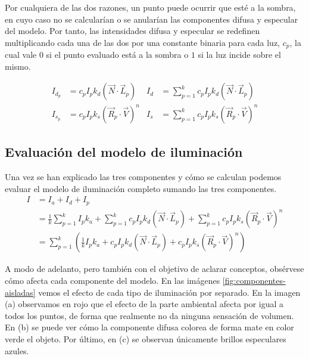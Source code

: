 Por cualquiera de las dos razones, un punto puede ocurrir que esté a la sombra, en cuyo caso no se calcularían o se anularían las componentes difusa y especular del modelo. Por tanto, las intensidades difusa y especular se redefinen multiplicando cada una de las dos por una constante binaria para cada luz, $c_p$, la cual vale $0$ si el punto evaluado está a la sombra o $1$ si la luz incide sobre el mismo.

\begin{align*}
    I_{d_p} &= c_p I_p k_d (\vec N\cdot \vec L_p)  & I_d &= \sum_{p=1}^k c_p I_p k_d (\vec N\cdot \vec L_p)\\
    I_{s_p} &= c_p I_p k_s (\vec R_p\cdot \vec V)^n & I_s &= \sum_{p=1}^k c_p I_p k_s (\vec R_p \cdot \vec V)^n
\end{align*}

\subsection{Evaluación del modelo de iluminación}

Una vez se han explicado las tres componentes y cómo se calculan podemos evaluar el modelo de iluminación completo sumando las tres componentes.
\begin{equation}
    \label{eq:phong}
    \begin{split}
        I &= I_a + I_d + I_p \\
        &=\frac{1}{k}\sum_{p=1}^k I_p k_a + \sum_{p=1}^{k}c_p I_p k_d (\vec N\cdot \vec L_p) + \sum_{p=1}^{k} c_p  I_p k_s (\vec R_p\cdot \vec V)^n \\
        &=\sum_{p=1}^{k}\left(\frac{1}{k}I_p k_a + c_p I_p k_d (\vec N\cdot \vec L_p) + c_p I_p k_s (\vec R_p\cdot \vec V)^n\right)
    \end{split}
\end{equation}

A modo de adelanto, pero también con el objetivo de aclarar conceptos, obsérvese cómo afecta cada componente del modelo. En las imágenes \ref{fig:componentes-aisladas} vemos el efecto de cada tipo de iluminación por separado. En la imagen (a) observamos en rojo que el efecto de la parte ambiental afecta por igual a todos los puntos, de forma que realmente no da ninguna sensación de volumen. En (b) se puede ver cómo la componente difusa colorea de forma mate en color verde el objeto. Por último, en (c) se observan únicamente brillos especulares azules.

